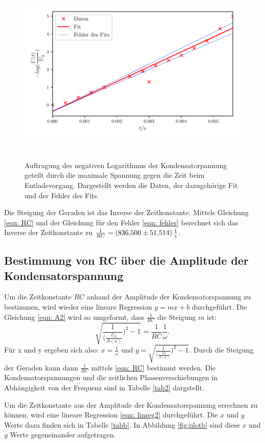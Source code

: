 \begin{figure}
  \centering
  \includegraphics[width=13cm, height=9cm]{build/plota.pdf}
  \caption{Auftragung des negativen Logarithmus der Kondensatorpannung geteilt durch die maximale Spannung gegen die Zeit beim Entladevorgang.
  Dargestellt werden die Daten, der dazugehörige Fit und der Fehler des Fits.}
  \label{fig:plota}
\end{figure}

\noindent Die Steigung der Geraden ist das Inverse der Zeitkonstante.
Mittels Gleichung \eqref{eqn: RC} und der Gleichung für den Fehler \eqref{eqn: fehler} berechnet
sich das Inverse der Zeitkonstante zu $\frac{1}{RC} = \SI[per-mode=fraction]{836.500 \pm 51.514}{\per\second}$.

\subsection{Bestimmung von RC über die Amplitude der Kondensatorspannung}
\label{sec: b}
Um die Zeitkonstante $RC$ anhand der Amplitude der Kondensatorspannung zu bestimmen, wird wieder eine lineare Regression $y=mx+b$ durchgeführt. %
Die Gleichung \eqref{eqn: A2} wird so umgeformt, dass $\frac{1}{RC}$ die Steigung $m$ ist:
\begin{equation}
    \sqrt{\frac{1}{(\frac{U_{0}}{A(\omega)}})^2 -1} = \frac{1}{RC} \frac{1}{\omega}.
    \label{eqn: linreg2}
\end{equation}
Für x und y ergeben sich also: $x=\frac{1}{\omega}$ und $y=\sqrt{\frac{1}{(\frac{U_{0}}{A(\omega)}})^2 -1}$. %
Durch die Steigung der Geraden kann dann $\frac{1}{RC}$ mittels \eqref{eqn: RC} bestimmt werden.
\newline
Die Kondensatorspannungen und die zeitlichen Phasenverschiebungen in Abhängigkeit
von der Frequenz sind in Tabelle \ref{tab2} dargstellt.

Um die Zeitkonstante aus der Amplitude der Kondensatorspannung errechnen zu können, wird eine lineare Regression 
\eqref{eqn: linreg2} durchgeführt. Die $x$ und $y$ Werte dazu finden sich in Tabelle \ref{tabb}.
In Abbildung \ref{fig:plotb} sind diese $x$ und $y$ Werte gegeneinander aufgetragen.


